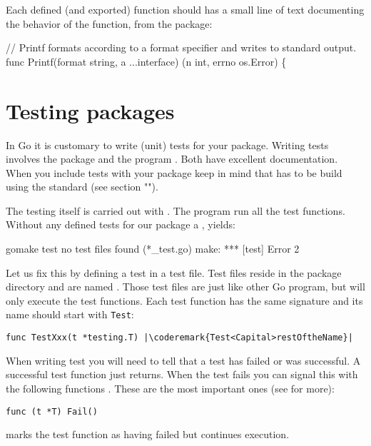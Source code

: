 Each defined (and exported) function should has a small line of text
documenting the behavior of the function, from the 
package:
\begin{display}
// Printf formats according to a format specifier and writes to standard output.
func Printf(format string, a ...interface{}) (n int, errno os.Error) \{
\end{display}

\section{Testing packages}
In Go it is customary to write (unit) tests for your package. Writing
tests involves the  package and the program
. Both
have excellent documentation. When you include tests with your package
keep in mind that has to be build using the standard 
(see section "").



The testing itself is carried out with .
The  program run all the test functions. Without any
defined tests for our  package a , yields:
\begin{display}
\pr gomake test
no test files found (*_test.go)
make: *** [test] Error 2
\end{display}
Let us fix this by defining a test in a test file. Test files reside
in the package directory and are named . Those test
files are just like other Go program, but  will only
execute the test functions.
Each test function has the same signature and its name should start
with \lstinline{Test}:
\begin{lstlisting}
func TestXxx(t *testing.T) |\coderemark{Test<Capital>restOftheName}|
\end{lstlisting}

When writing test you will need to tell  that a test has
failed or was successful. A successful test function just returns. When
the test fails you can signal this with the following
functions \cite{go_doc}. These are the most important ones (see 
for more):

\begin{lstlisting}[numbers=none]
func (t *T) Fail()
\end{lstlisting}
 marks the test function as having failed but continues execution.

